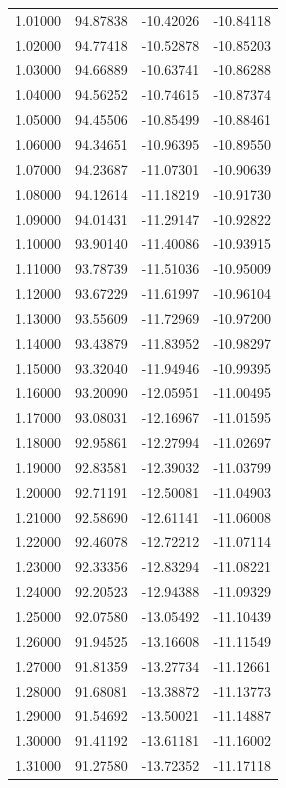\begin{table}
\begin{tabular}{llll}
1.01000 & 94.87838 & -10.42026 & -10.84118 \\
1.02000 & 94.77418 & -10.52878 & -10.85203 \\
1.03000 & 94.66889 & -10.63741 & -10.86288 \\
1.04000 & 94.56252 & -10.74615 & -10.87374 \\
1.05000 & 94.45506 & -10.85499 & -10.88461 \\
1.06000 & 94.34651 & -10.96395 & -10.89550 \\
1.07000 & 94.23687 & -11.07301 & -10.90639 \\
1.08000 & 94.12614 & -11.18219 & -10.91730 \\
1.09000 & 94.01431 & -11.29147 & -10.92822 \\
1.10000 & 93.90140 & -11.40086 & -10.93915 \\
1.11000 & 93.78739 & -11.51036 & -10.95009 \\
1.12000 & 93.67229 & -11.61997 & -10.96104 \\
1.13000 & 93.55609 & -11.72969 & -10.97200 \\
1.14000 & 93.43879 & -11.83952 & -10.98297 \\
1.15000 & 93.32040 & -11.94946 & -10.99395 \\
1.16000 & 93.20090 & -12.05951 & -11.00495 \\
1.17000 & 93.08031 & -12.16967 & -11.01595 \\
1.18000 & 92.95861 & -12.27994 & -11.02697 \\
1.19000 & 92.83581 & -12.39032 & -11.03799 \\
1.20000 & 92.71191 & -12.50081 & -11.04903 \\
1.21000 & 92.58690 & -12.61141 & -11.06008 \\
1.22000 & 92.46078 & -12.72212 & -11.07114 \\
1.23000 & 92.33356 & -12.83294 & -11.08221 \\
1.24000 & 92.20523 & -12.94388 & -11.09329 \\
1.25000 & 92.07580 & -13.05492 & -11.10439 \\
1.26000 & 91.94525 & -13.16608 & -11.11549 \\
1.27000 & 91.81359 & -13.27734 & -11.12661 \\
1.28000 & 91.68081 & -13.38872 & -11.13773 \\
1.29000 & 91.54692 & -13.50021 & -11.14887 \\
1.30000 & 91.41192 & -13.61181 & -11.16002 \\
1.31000 & 91.27580 & -13.72352 & -11.17118 \\

\end{tabular}
\end{table}
